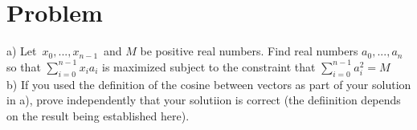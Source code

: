 \documentclass[11pt,a4paper]{report}
\theoremstyle{plain}
\theoremstyle{definition}
\theoremstyle{remark}
\begin{document}
\section*{Problem}
a)  Let $x_0 , ... , x_{n-1}$ and $M$ be positive real numbers.  Find real numbers $a_0, ..., a_n$ so that $\sum_{i = 0}^{n-1} x_i a_i$ is maximized subject to the constraint that $\sum_{i = 0}^{n-1} a_i ^2 = M$
\\
b) If you used the definition of the cosine between vectors as part of your solution in a), prove independently that your solutiion is correct (the defiinition depends on the result being established here).
\end{document}
